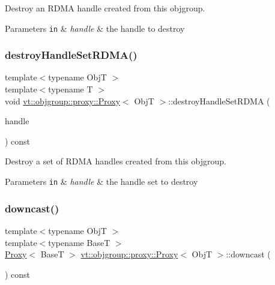 Destroy an R\+D\+MA handle created from this objgroup. 


\begin{DoxyParams}[1]{Parameters}
\mbox{\tt in}  & {\em handle} & the handle to destroy \\
\hline
\end{DoxyParams}
\mbox{\label{structvt_1_1objgroup_1_1proxy_1_1_proxy_a9211f7a2459cfcb28f8b90dbdc77c8bc}} 
\subsubsection{\texorpdfstring{destroy\+Handle\+Set\+R\+D\+M\+A()}{destroyHandleSetRDMA()}}
{\footnotesize\ttfamily template$<$typename ObjT $>$ \\
template$<$typename T $>$ \\
void \hyperlink{structvt_1_1objgroup_1_1proxy_1_1_proxy}{vt\+::objgroup\+::proxy\+::\+Proxy}$<$ ObjT $>$\+::destroy\+Handle\+Set\+R\+D\+MA (\begin{DoxyParamCaption}\item[{\hyperlink{structvt_1_1rdma_1_1_handle_set}{vt\+::rdma\+::\+Handle\+Set}$<$ T $>$}]{handle }\end{DoxyParamCaption}) const}



Destroy a set of R\+D\+MA handles created from this objgroup. 


\begin{DoxyParams}[1]{Parameters}
\mbox{\tt in}  & {\em handle} & the handle set to destroy \\
\hline
\end{DoxyParams}
\mbox{\label{structvt_1_1objgroup_1_1proxy_1_1_proxy_ae672794dc83491200d7f6e794865a6bc}} 
\subsubsection{\texorpdfstring{downcast()}{downcast()}}
{\footnotesize\ttfamily template$<$typename ObjT $>$ \\
template$<$typename BaseT $>$ \\
\hyperlink{structvt_1_1objgroup_1_1proxy_1_1_proxy}{Proxy}$<$ BaseT $>$ \hyperlink{structvt_1_1objgroup_1_1proxy_1_1_proxy}{vt\+::objgroup\+::proxy\+::\+Proxy}$<$ ObjT $>$\+::downcast (\begin{DoxyParamCaption}{ }\end{DoxyParamCaption}) const}




